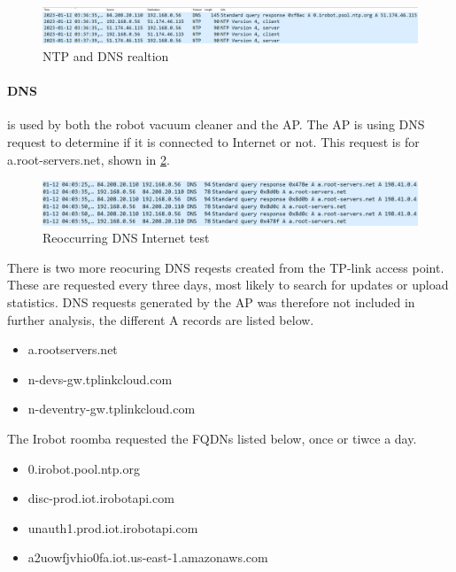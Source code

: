 \begin{figure}[H]
    \centering
    \includegraphics[width=\textwidth]{figures/ntp_dns.png}
    \caption{NTP and DNS realtion}
    \label{fig:ntp_dns2}
\end{figure}

\paragraph{DNS} is used by both the robot vacuum cleaner and the AP. The AP is using DNS request to determine if it is connected to Internet or not. This request is for a.root-servers.net, shown in \ref{fig:dns_a-root}.

\begin{figure}[H]
    \centering
    \includegraphics[width=\textwidth]{figures/DNS_a-root.png}
    \caption{Reoccurring DNS Internet test}
    \label{fig:dns_a-root}
\end{figure}

There is two more reocuring DNS reqests created from the TP-link access point. These are requested every three days, most likely to search for updates or upload statistics. DNS requests generated by the AP was therefore not included in further analysis, the different A records are listed below. 

\begin{itemize}
    \item a.rootservers.net
    \item n-devs-gw.tplinkcloud.com
    \item n-deventry-gw.tplinkcloud.com
\end{itemize}

The Irobot roomba requested the FQDNs listed below, once or tiwce a day. 
\begin{itemize}
    \item 0.irobot.pool.ntp.org
    \item disc-prod.iot.irobotapi.com
    \item unauth1.prod.iot.irobotapi.com
    \item a2uowfjvhio0fa.iot.us-east-1.amazonaws.com
\end{itemize}

